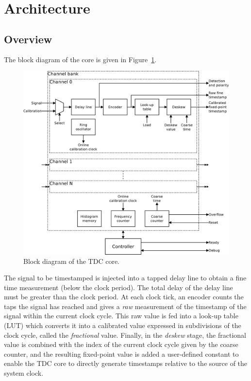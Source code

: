 \documentclass[a4paper,11pt]{article}
\begin{document}
\section{Architecture}
\subsection{Overview}
The block diagram of the core is given in Figure~\ref{fig:block}.

\begin{figure}[h]
\includegraphics[width=\textwidth]{block.pdf}
\caption{Block diagram of the TDC core.}
\label{fig:block}
\end{figure}

The signal to be timestamped is injected into a tapped delay line to obtain a fine time measurement (below the clock period). The total delay of the delay line must be greater than the clock period. At each clock tick, an encoder counts the taps the signal has reached and gives a \textit{raw} measurement of the timestamp of the signal within the current clock cycle. This raw value is fed into a look-up table (LUT) which converts it into a calibrated value expressed in subdivisions of the clock cycle, called the \textit{fractional} value. Finally, in the \textit{deskew} stage, the fractional value is combined with the index of the current clock cycle given by the coarse counter, and the resulting fixed-point value is added a user-defined constant to enable the TDC core to directly generate timestamps relative to the source of the system clock.
\end{document}
